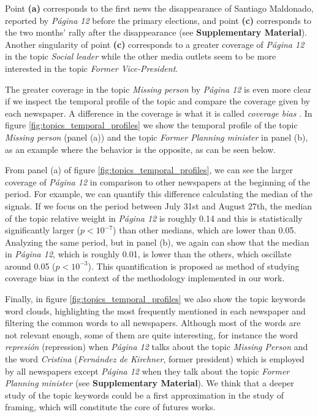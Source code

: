 \documentclass{bmcart}
\begin{document}
\par Point \textbf{(a)} corresponds  to the first news the disappearance of Santiago Maldonado, reported by \emph{P\'agina 12} before the primary elections, and point \textbf{(c)} corresponds to  the two months' rally after the disappearance  (see \textbf{Supplementary Material}). Another singularity of point \textbf{(c)} corresponds to a greater coverage of \emph{P\'agina 12} in the topic \emph{Social leader} while the other media outlets seem to be more interested in the topic \emph{Former Vice-President}.

\par The greater coverage in the topic \emph{Missing person} by \emph{P\'agina 12} is even more clear if we inspect the temporal profile of the topic and compare the coverage given by each newspaper. A difference in the coverage is what it is called \emph{coverage bias} \cite{dallmann2015media}.  In figure \ref{fig:topics_temporal_profiles} we show the temporal profile of the topic \emph{Missing person} (panel (a)) and the topic \emph{Former Planning minister} in panel (b), as an example where the behavior is the opposite, as can be seen below.

\par From panel (a) of figure \ref{fig:topics_temporal_profiles}, we can see the larger coverage of \emph{P\'agina 12} in comparison to other newspapers at the beginning of the period. For example, we can quantify this difference calculating  the median of the signals. If we focus on the period between July 31st and August 27th, the median of the topic relative weight in \emph{P\'agina 12} is roughly 0.14 and this is statistically significantly larger ($p < 10^{-7}$) than other medians, which are lower than 0.05.
Analyzing the same period, but in panel (b), we again can show that the median in \emph{P\'agina 12}, which is roughly 0.01, is lower than the others, which oscillate around 0.05 ($p<10^{-3}$).
This quantification is proposed as method of studying coverage bias in the context of the methodology implemented in our work. 

\par Finally, in figure \ref{fig:topics_temporal_profiles} we also show the topic keywords word clouds, highlighting the most frequently mentioned in each newspaper and filtering the common words to all newspapers.
Although most of the words are not relevant enough, some of them are quite interesting, for instance the word \emph{represi\'on} (repression) when \emph{P\'agina 12} talks about the topic \emph{Missing Person} and the word \emph{Cristina} (\emph{Fern\'andez de Kirchner}, former president) which is employed by all newspapers except \emph{P\'agina 12} when they  talk about the topic \emph{Former Planning minister} (see \textbf{Supplementary Material}).
We think that a deeper study of the topic keywords could be a first approximation in the study of framing, which will constitute the core of futures works.
\end{document}
